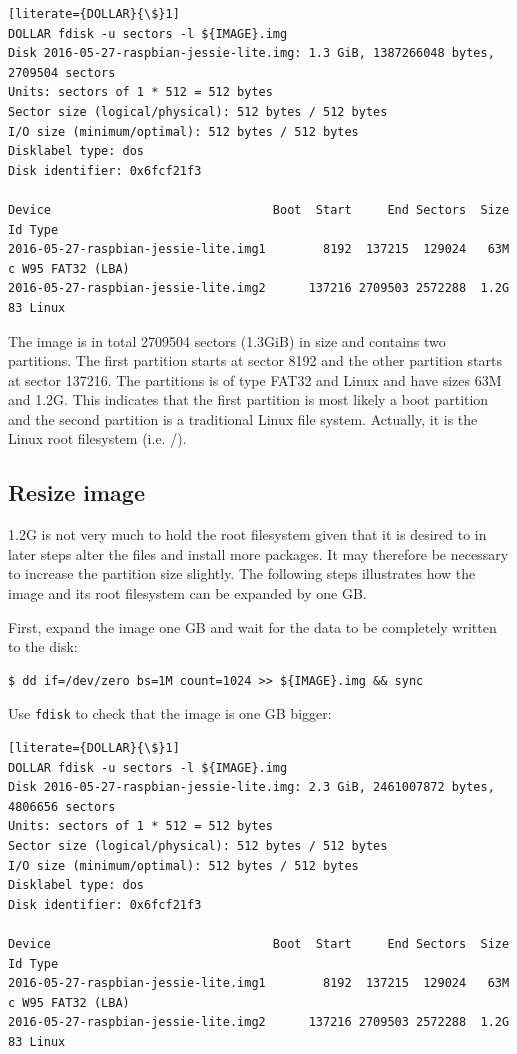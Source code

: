 \begin{lstlisting}[literate={DOLLAR}{\$}1]
DOLLAR fdisk -u sectors -l ${IMAGE}.img
Disk 2016-05-27-raspbian-jessie-lite.img: 1.3 GiB, 1387266048 bytes, 2709504 sectors
Units: sectors of 1 * 512 = 512 bytes
Sector size (logical/physical): 512 bytes / 512 bytes
I/O size (minimum/optimal): 512 bytes / 512 bytes
Disklabel type: dos
Disk identifier: 0x6fcf21f3

Device                               Boot  Start     End Sectors  Size Id Type
2016-05-27-raspbian-jessie-lite.img1        8192  137215  129024   63M  c W95 FAT32 (LBA)
2016-05-27-raspbian-jessie-lite.img2      137216 2709503 2572288  1.2G 83 Linux
\end{lstlisting}
\FloatBarrier

The image is in total 2709504 sectors (1.3GiB) in size and contains two
partitions. The first partition starts at sector 8192 and
the other partition starts at sector 137216. The partitions is of type FAT32
and Linux and have sizes 63M and 1.2G. This indicates that the first partition
is most likely a boot partition and the second partition is a traditional Linux file
system. Actually, it is the Linux root filesystem (i.e. /).

\subsection{Resize image}
1.2G is not very much to hold the root filesystem given that it is desired to
in later steps alter the files and install more packages. It may therefore be
necessary to increase the partition size slightly.
The following steps illustrates how the image and its root filesystem
can be expanded by one \ac{GB}.

First, expand the image one \ac{GB} and wait for the data to be completely written
to the disk:
\begin{lstlisting}[]
$ dd if=/dev/zero bs=1M count=1024 >> ${IMAGE}.img && sync
\end{lstlisting}
\FloatBarrier
\vspace{-5mm}

Use \texttt{fdisk} to check that the image is one \ac{GB} bigger:
\begin{lstlisting}[literate={DOLLAR}{\$}1]
DOLLAR fdisk -u sectors -l ${IMAGE}.img
Disk 2016-05-27-raspbian-jessie-lite.img: 2.3 GiB, 2461007872 bytes, 4806656 sectors
Units: sectors of 1 * 512 = 512 bytes
Sector size (logical/physical): 512 bytes / 512 bytes
I/O size (minimum/optimal): 512 bytes / 512 bytes
Disklabel type: dos
Disk identifier: 0x6fcf21f3

Device                               Boot  Start     End Sectors  Size Id Type
2016-05-27-raspbian-jessie-lite.img1        8192  137215  129024   63M  c W95 FAT32 (LBA)
2016-05-27-raspbian-jessie-lite.img2      137216 2709503 2572288  1.2G 83 Linux
\end{lstlisting}
\FloatBarrier
\vspace{-5mm}

